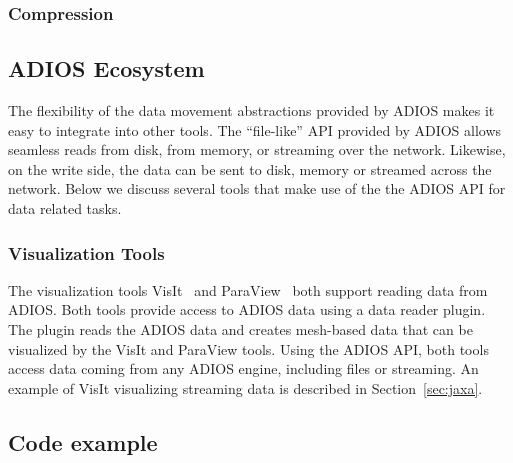 \subsubsection{Compression}



\subsection{ADIOS Ecosystem}
The flexibility of the data movement abstractions provided by ADIOS makes it easy to integrate into other tools. The ``file-like'' API provided by ADIOS allows seamless reads from disk, from memory, or streaming over the network. Likewise, on the write side, the data can be sent to disk, memory or streamed across the network.
Below we discuss several tools that make use of the the ADIOS API for data related tasks.

\subsubsection{Visualization Tools}
The visualization tools VisIt~\cite{HPV:VisIt} and ParaView~\cite{paraview} both support reading data from ADIOS.
Both tools provide access to ADIOS data using a data reader plugin.
The plugin reads the ADIOS data and creates mesh-based data that can be visualized by the VisIt and ParaView tools.
Using the ADIOS API, both tools access data coming from any ADIOS engine, including files or streaming.
An example of VisIt visualizing streaming data is described in Section~\ref{sec:jaxa}.



\subsection{Code example}
